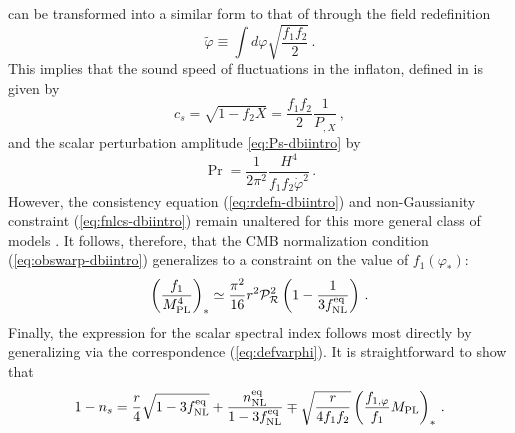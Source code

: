can be transformed into a similar form to that of 
 through the field redefinition 
% 
\begin{equation}
\label{eq:defvarphi}
\tilde{\varphi} \equiv \int d \varphi \sqrt{\frac{f_1f_2}{2}}  \,.
\end{equation}
% 
This implies that the sound speed of fluctuations in 
the inflaton, defined in  is given by
%  
\begin{equation}
\label{eq:cs-dbi}
c_s = \sqrt{1-f_2 X} = \frac{f_1f_2}{2} \frac{1}{P_{,X}}  \,,
\end{equation}
% 
and the scalar perturbation amplitude \eqref{eq:Ps-dbiintro} by
% 
\begin{equation}
\label{eq:spectrum-dbi}
\Pr = \frac{1}{2\pi^2}\frac{H^4}{f_1f_2\dot{\varphi}^2}  \,.
\end{equation}
% 
However, the consistency equation (\ref{eq:rdefn-dbiintro}) and 
non-Gaussianity constraint (\ref{eq:fnlcs-dbiintro}) remain unaltered 
for this more general class 
of models \cite{lidser2}. It 
follows, therefore, 
that the CMB normalization condition (\ref{eq:obswarp-dbiintro}) 
generalizes to a constraint on the value of $f_1 (\varphi_*)$:
%   
\begin{equation}
\label{eq:observef1}
\left( \frac{f_1}{M_{\mathrm{PL}}^4} \right)_{*} \simeq \frac{\pi^2}{16} r^2\mathcal{P}_{\mathcal{R}}^2 
\left( 1- \frac{1}{3f_{\mathrm{NL}}^{\mathrm{eq}}} \right)  \,.
\end{equation}
% 
Finally, the expression for the scalar spectral index
follows most directly by generalizing  
via the correspondence (\ref{eq:defvarphi}). It  
is straightforward to show that
%  
\begin{equation}
\label{eq:nsconstraintW}
1-n_s = \frac{r}{4} \sqrt{1-3f_{\mathrm{NL}}^{\mathrm{eq}}}
 +\frac{n_{\mathrm{NL}}^{\mathrm{eq}}}{1-3f_{\mathrm{NL}}^{\mathrm{eq}}} \mp \sqrt{\frac{r}{4f_1f_2}} \left( 
\frac{f_{1,\varphi}}{f_1} M_{\mathrm{PL}} \right)_*  \,.
\end{equation}
% 


